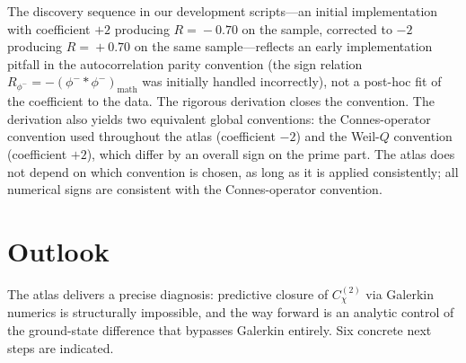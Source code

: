 \documentclass[a4paper,10pt,twocolumn]{article}
\theoremstyle{definition}
\theoremstyle{remark}
\newcommand{\chifn}{\chi}
\begin{document}
The discovery sequence in our development scripts---an initial
implementation with coefficient $+2$ producing $R\!=\!-0.70$ on the
sample, corrected to $-2$ producing $R\!=\!+0.70$ on the same
sample---reflects an early implementation pitfall in the
autocorrelation parity convention (the sign relation
$R_{\phi^-}=-(\phi^-{*}\phi^-)_{\mathrm{math}}$ was initially handled
incorrectly), not a post-hoc fit of the coefficient to the data. The
rigorous derivation closes the convention. The derivation also yields
two equivalent global conventions: the Connes-operator convention
used throughout the atlas (coefficient $-2$) and the Weil-$Q$
convention (coefficient $+2$), which differ by an overall sign on
the prime part. The atlas does not depend on which convention is
chosen, as long as it is applied consistently; all numerical signs
are consistent with the Connes-operator convention.

\section{Outlook}
\label{sec:outlook}

The atlas delivers a precise diagnosis: predictive closure of
$C^{(2)}_{\chifn}$ via Galerkin numerics is structurally
impossible, and the way forward is an analytic control of the
ground-state difference that bypasses Galerkin entirely. Six
concrete next steps are indicated.
\end{document}
